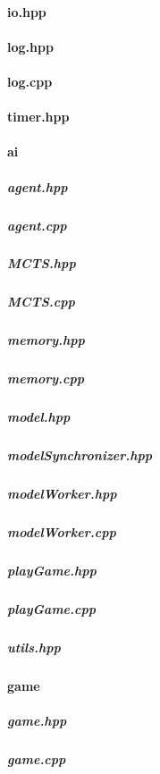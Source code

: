 \documentclass[12pt]{article}
\newcommand{\incFile}[2]{\label{code:#2}\newpage}
\begin{document}
\paragraph{io.hpp}															\incFile{C++}{AlphaZeroPytorch/include/io.hpp}
\paragraph{log.hpp}														\incFile{C++}{AlphaZeroPytorch/include/log.hpp}
\paragraph{log.cpp}														\incFile{C++}{AlphaZeroPytorch/include/log.cpp}
\paragraph{timer.hpp}													\incFile{C++}{AlphaZeroPytorch/include/timer.hpp}
\paragraph{ai}																	%
\subparagraph{agent.hpp}												\incFile{C++}{AlphaZeroPytorch/include/ai/agent.hpp}
\subparagraph{agent.cpp}												\incFile{C++}{AlphaZeroPytorch/include/ai/agent.cpp}
\subparagraph{MCTS.hpp}												\incFile{C++}{AlphaZeroPytorch/include/ai/MCTS.hpp}
\subparagraph{MCTS.cpp}												\incFile{C++}{AlphaZeroPytorch/include/ai/MCTS.cpp}
\subparagraph{memory.hpp}											\incFile{C++}{AlphaZeroPytorch/include/ai/memory.hpp}
\subparagraph{memory.cpp}											\incFile{C++}{AlphaZeroPytorch/include/ai/memory.cpp}
\subparagraph{model.hpp}											\incFile{C++}{AlphaZeroPytorch/include/ai/model.hpp}
\subparagraph{modelSynchronizer.hpp}						\incFile{C++}{AlphaZeroPytorch/include/ai/modelSynchronizer.hpp}
\subparagraph{modelWorker.hpp}								\incFile{C++}{AlphaZeroPytorch/include/ai/modelWorker.hpp}
\subparagraph{modelWorker.cpp}									\incFile{C++}{AlphaZeroPytorch/include/ai/modelWorker.cpp}
\subparagraph{playGame.hpp}										\incFile{C++}{AlphaZeroPytorch/include/ai/playGame.hpp}
\subparagraph{playGame.cpp}										\incFile{C++}{AlphaZeroPytorch/include/ai/playGame.cpp}
\subparagraph{utils.hpp}												\incFile{C++}{AlphaZeroPytorch/include/ai/utils.hpp}
\paragraph{game}															%
\subparagraph{game.hpp}												\incFile{C++}{AlphaZeroPytorch/include/game/game.hpp}
\subparagraph{game.cpp}												\incFile{C++}{AlphaZeroPytorch/include/game/game.cpp}
\end{document}
